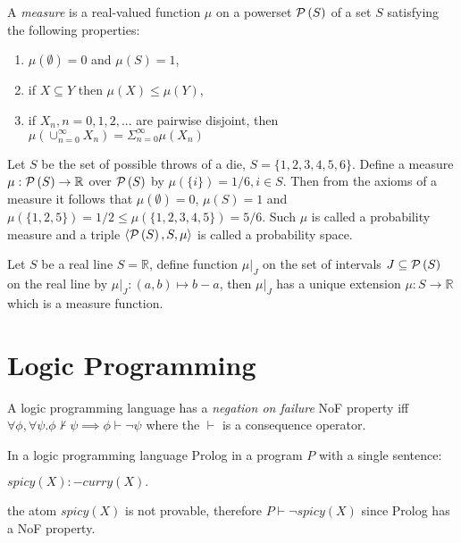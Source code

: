 \begin{defn}
A \emph{measure} is a real-valued function $\mu$ on a powerset $\mathcal{P} \left({ S }\right)$ of a set $S$ satisfying the following properties:
\begin{enumerate}
\item $\mu(\emptyset)=0$ and $\mu(S)=1$,
\item if $X \subseteq Y$ then $\mu(X) \le \mu(Y)$,
\item if $X_n, n=0, 1, 2, ...$ are pairwise disjoint, then
$\mu(\cup^\infty_{n=0} X_n)=\Sigma^\infty_{n=0}\mu(X_n)$
\end{enumerate}
\end{defn}

\begin{exmp}
Let $S$ be the set of possible throws of a die, $S=\{1, 2, 3, 4, 5, 6\}$. Define a measure $\mu:\mathcal{P} \left({ S }\right) \to \mathbb{R}$ over $\mathcal{P} \left({ S }\right)$ by $\mu(\{i\})=1/6, i \in S$. Then from the axioms of a measure it follows that $\mu(\emptyset)=0$, $\mu(S)=1$ and $\mu(\{1,2,5\})=1/2 \le \mu(\{1,2,3,4,5\})=5/6$. Such $\mu$ is called a probability measure and a triple $\langle \mathcal{P} \left({ S }\right), S, \mu \rangle$ is called a probability space.
\end{exmp}

\begin{exmp}
Let $S$ be a real line $S=\mathbb{R}$, define function $\mu|_J$ on the set of intervals $J \subseteq \mathcal{P} \left({ S }\right)$ on the real line by $\mu|_J: (a, b) \mapsto b-a$, then $\mu|_J$ has a unique extension $\mu:S \to \mathbb{R}$ which is a measure function.
\end{exmp}

\section{Logic Programming}

\begin{defn}
A logic programming language has a \emph{negation on failure}\cite{clark1978} NoF property iff $\forall \phi, \forall \psi. \phi \not\vdash \psi \implies \phi \vdash \neg\psi$ where the $\vdash$ is a consequence operator.
\end{defn}

\begin{exmp}
In a logic programming language Prolog in a program $P$ with a single sentence:

$spicy(X) :- curry(X).$

the atom $spicy(X)$ is not provable, therefore $P \vdash \neg spicy(X)$ since Prolog has a NoF property.
\end{exmp}

